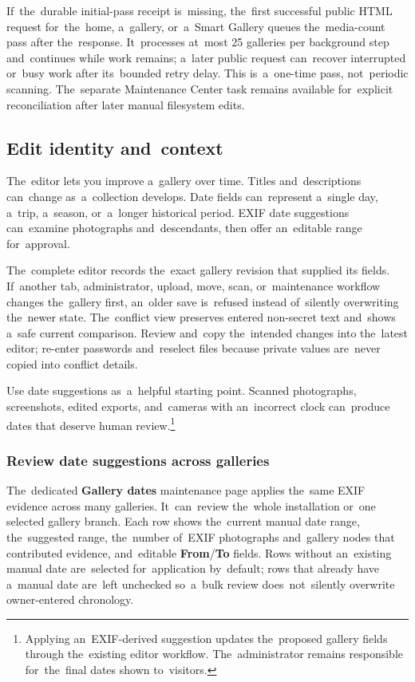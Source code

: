 \documentclass[11pt,a4paper]{article}
\newcommand{\ui}[1]{\textbf{#1}}
\begin{document}
If~the~durable initial-pass receipt is~missing, the~first successful public
HTML request for~the~home, a~gallery, or~a~Smart Gallery queues the~media-count
pass after the~response. It~processes at~most 25 galleries per background step
and~continues while work remains; a~later public request can~recover interrupted
or~busy work after its~bounded retry delay. This is~a~one-time pass,
not~periodic
scanning. The~separate Maintenance Center task remains available for~explicit
reconciliation after later manual filesystem edits.

\subsection{Edit identity and~context}

The~editor lets you improve a~gallery over time. Titles and~descriptions
can~change as~a~collection develops. Date fields can~represent a~single day,
a~trip, a~season, or~a~longer historical period. EXIF date suggestions
can~examine photographs and~descendants, then offer an~editable range
for~approval.

The~complete editor records the~exact gallery revision that supplied its fields.
If~another tab, administrator, upload, move, scan, or~maintenance workflow
changes the~gallery first, an~older save is~refused instead of~silently
overwriting the~newer state. The~conflict view preserves entered non-secret text
and~shows a~safe current comparison. Review and~copy the~intended changes into
the~latest editor; re-enter passwords and~reselect files because private values
are~never copied into conflict details.

Use date suggestions as~a~helpful starting point. Scanned photographs,
screenshots, edited exports, and~cameras with an~incorrect clock can~produce
dates that deserve human review.\footnote{Applying an~EXIF-derived suggestion
updates the~proposed gallery fields through the~existing editor workflow.
The~administrator remains responsible for~the~final dates shown to~visitors.}

\subsubsection{Review date suggestions across galleries}

The~dedicated \ui{Gallery dates} maintenance page applies the~same EXIF evidence
across many galleries. It~can~review the~whole installation or~one selected
gallery branch. Each row shows the~current manual date range, the~suggested
range, the~number of~EXIF photographs and~gallery nodes that contributed
evidence, and~editable \ui{From}/\ui{To} fields. Rows without an~existing manual
date are~selected for~application by~default; rows that already have a~manual
date are~left unchecked so~a~bulk review does~not~silently overwrite
owner-entered chronology.
\end{document}
